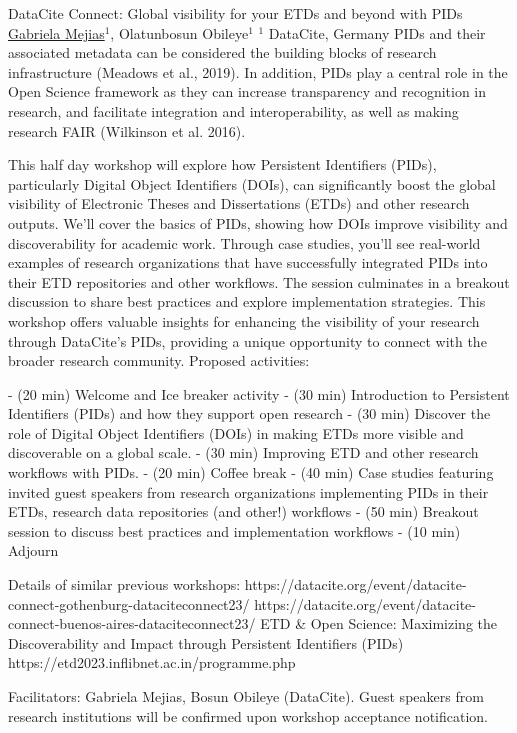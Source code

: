 
    \begin{abstract_online}{DataCite Connect: Global visibility for your ETDs and beyond with PIDs}{%
        \underline{Gabriela Mejias}$^{1}$, Olatunbosun Obileye$^{1}$}{%
        }{%
        $^1$ DataCite, Germany}
        PIDs and their associated metadata can be considered the building blocks of research infrastructure (Meadows et al., 2019).  In addition,  PIDs play a central role in the Open Science framework as they can increase transparency and recognition in research, and facilitate integration and interoperability, as well as making research FAIR (Wilkinson et al. 2016).

        This half day  workshop will explore how Persistent Identifiers (PIDs), particularly Digital Object Identifiers (DOIs), can significantly boost the global visibility of Electronic Theses and Dissertations (ETDs) and other research outputs. We'll cover the basics of PIDs, showing how DOIs improve visibility and discoverability for academic work. Through case studies, you'll see real-world examples of research organizations that have successfully integrated PIDs into their ETD repositories and other workflows. The session culminates in a breakout discussion to share best practices and explore implementation strategies. This workshop offers valuable insights for enhancing the visibility of your research through DataCite's PIDs, providing a unique opportunity to connect with the broader research community.
        Proposed activities:

        - (20 min) Welcome and Ice breaker activity
        - (30 min) Introduction to Persistent Identifiers (PIDs) and how they support open research
        - (30 min) Discover the role of Digital Object Identifiers (DOIs) in making ETDs more visible and discoverable on a global scale.
        - (30 min) Improving ETD and other research workflows with PIDs.
        - (20 min) Coffee break
        - (40 min) Case studies featuring invited guest speakers from research organizations implementing PIDs in their ETDs, research data repositories (and other!) workflows
        - (50 min) Breakout session to discuss best practices and implementation workflows
        - (10 min) Adjourn

        Details of similar previous workshops: https://datacite.org/event/datacite-connect-gothenburg-dataciteconnect23/
        https://datacite.org/event/datacite-connect-buenos-aires-dataciteconnect23/
        ETD \& Open Science: Maximizing the Discoverability and Impact
        through Persistent Identifiers (PIDs) https://etd2023.inflibnet.ac.in/programme.php

        Facilitators: Gabriela Mejias, Bosun Obileye (DataCite). Guest speakers from research institutions will be confirmed upon workshop acceptance notification.
    
    \end{abstract_online}
    
